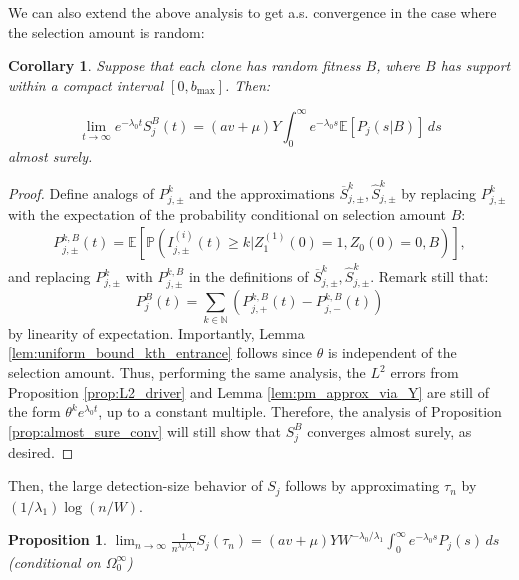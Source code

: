 \documentclass{article}
\numberwithin{equation}{section}
\newtheorem{corollary}[theorem]{Corollary}
\newtheorem{proposition}{Proposition}
\begin{document}
We can also extend the above analysis to get a.s. convergence in the case where the selection amount is random:

\begin{corollary}
    Suppose that each clone has random fitness $B$, where $B$ has support within a compact interval $[0,b_{\text{max}}]$. Then:

    \[\lim_{t\to\infty}e^{-\lambda_0t}S_j^B(t)=(av+\mu)Y\int_0^\infty e^{-\lambda_0 s}\mathbb{E}\left[P_j(s|B)\right]\,ds\]
 almost surely.\label{cor:L2_as_random_fitness}
\end{corollary}

\begin{proof}
  Define analogs of $P_{j,\pm}^k$ and the approximations $\overline{S}_{j,\pm}^k,\widehat{S}_{j,\pm}^k$ by replacing $P_{j,\pm}^k$ with the expectation of the probability conditional on selection amount $B$:
  \begin{align*}
      P_{j,\pm}^{k,B}(t)=\mathbb{E}[\mathbb{P}(I_{j,\pm}^{(i)}(t)\geq k|Z_1^{(1)}(0)=1,Z_0(0)=0,B)],
  \end{align*}
  and replacing $P_{j,\pm}^k$ with $P_{j,\pm}^{k,B}$ in the definitions of $\overline{S}_{j,\pm}^k,\widehat{S}_{j,\pm}^k$. Remark still that:
  \[P_{j}^B(t)=\sum_{k\in \mathbb{N}}\left(P_{j,+}^{k,B}(t)-P_{j,-}^{k,B}(t)\right)\]
  by linearity of expectation. Importantly, Lemma \ref{lem:uniform_bound_kth_entrance} follows since $\theta$ is independent of the selection amount. Thus, performing the same analysis, the $L^2$ errors from Proposition \ref{prop:L2_driver} and Lemma \ref{lem:pm_approx_via_Y} are still of the form $\theta^k e^{\lambda_0 t}$, up to a constant multiple. Therefore, the analysis of Proposition \ref{prop:almost_sure_conv} will still show that $S_j^B$ converges almost surely, as desired.

\end{proof}

Then, the large detection-size behavior of $S_j$ follows by approximating $\tau_n$ by $ (1/\lambda_1)\log(n/W)$.

\begin{proposition}
    $\lim_{n\to\infty} \frac{1}{n^{\lambda_0/\lambda_1}}S_j(\tau_n)=(av+\mu)YW^{-\lambda_0/\lambda_1}\int_0^\infty e^{-\lambda_0 s}P_j(s)\,ds$ (conditional on $\Omega_0^\infty$)\label{prop:convergence_detection_size}
\end{proposition}
\end{document}
